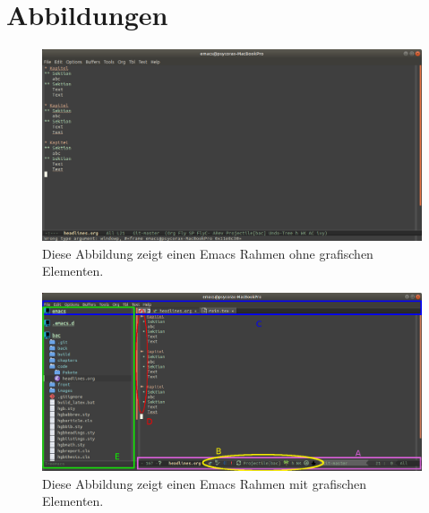 \chapter{Abbildungen}
\label{cha:abbildungen}

\begin{figure}[ht]
  \centering
  \includegraphics[width=1\textheight, angle=90]{./images/Pakete/nogui.png}
  \caption{\label{fig:nogui} Diese Abbildung zeigt einen Emacs Rahmen
    ohne grafischen Elementen.}
\end{figure}

\begin{figure}[ht]
  \centering
  \includegraphics[width=1\textheight, angle=90]{./images/Pakete/gui.png}
  \caption{\label{fig:gui} Diese Abbildung zeigt einen Emacs Rahmen
    mit grafischen Elementen.}
\end{figure}
